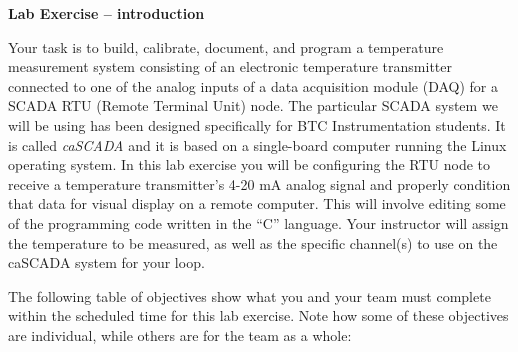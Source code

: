 

\noindent
{\bf Lab Exercise -- introduction}

\vskip 5pt

Your task is to build, calibrate, document, and program a temperature measurement system consisting of an electronic temperature transmitter connected to one of the analog inputs of a data acquisition module (DAQ) for a SCADA RTU (Remote Terminal Unit) node.  The particular SCADA system we will be using has been designed specifically for BTC Instrumentation students.  It is called {\sl caSCADA} and it is based on a single-board computer running the Linux operating system.  In this lab exercise you will be configuring the RTU node to receive a temperature transmitter's 4-20 mA analog signal and properly condition that data for visual display on a remote computer.  This will involve editing some of the programming code written in the ``C'' language.  Your instructor will assign the temperature to be measured, as well as the specific channel(s) to use on the caSCADA system for your loop.

The following table of objectives show what you and your team must complete within the scheduled time for this lab exercise.  Note how some of these objectives are individual, while others are for the team as a whole:



